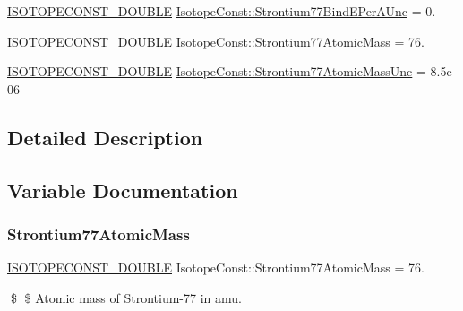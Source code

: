 \begin{DoxyCompactItemize}
\mbox{\hyperlink{group___isotope_const-_macros_ga8f45a7272ce02c0b4c65c44636ed719a}{I\+S\+O\+T\+O\+P\+E\+C\+O\+N\+S\+T\+\_\+\+D\+O\+U\+B\+LE}} \mbox{\hyperlink{group___isotope_const-_strontium-_sr77_ga6baf69eccbaf10c41761f13aed07cee5}{Isotope\+Const\+::\+Strontium77\+Bind\+E\+Per\+A\+Unc}} = 0.
\item 
\mbox{\hyperlink{group___isotope_const-_macros_ga8f45a7272ce02c0b4c65c44636ed719a}{I\+S\+O\+T\+O\+P\+E\+C\+O\+N\+S\+T\+\_\+\+D\+O\+U\+B\+LE}} \mbox{\hyperlink{group___isotope_const-_strontium-_sr77_ga3ef68f249db764e750bd34c6548700f9}{Isotope\+Const\+::\+Strontium77\+Atomic\+Mass}} = 76.
\item 
\mbox{\hyperlink{group___isotope_const-_macros_ga8f45a7272ce02c0b4c65c44636ed719a}{I\+S\+O\+T\+O\+P\+E\+C\+O\+N\+S\+T\+\_\+\+D\+O\+U\+B\+LE}} \mbox{\hyperlink{group___isotope_const-_strontium-_sr77_ga2ef4738be82fc05739202640a3d6b6b0}{Isotope\+Const\+::\+Strontium77\+Atomic\+Mass\+Unc}} = 8.\+5e-\/06
\end{DoxyCompactItemize}


\subsection{Detailed Description}


\subsection{Variable Documentation}
\mbox{\label{group___isotope_const-_strontium-_sr77_ga3ef68f249db764e750bd34c6548700f9}} 
\subsubsection{\texorpdfstring{Strontium77\+Atomic\+Mass}{Strontium77AtomicMass}}
{\footnotesize\ttfamily \mbox{\hyperlink{group___isotope_const-_macros_ga8f45a7272ce02c0b4c65c44636ed719a}{I\+S\+O\+T\+O\+P\+E\+C\+O\+N\+S\+T\+\_\+\+D\+O\+U\+B\+LE}} Isotope\+Const\+::\+Strontium77\+Atomic\+Mass = 76.}

\$ \$ Atomic mass of Strontium-\/77 in amu. \mbox{\label{group___isotope_const-_strontium-_sr77_ga2ef4738be82fc05739202640a3d6b6b0}} 
